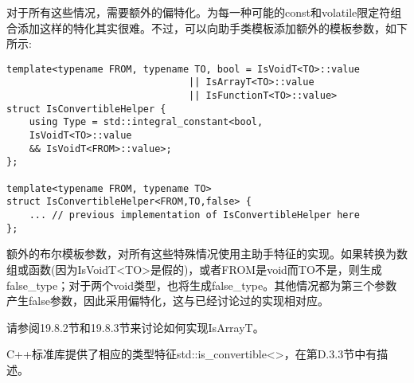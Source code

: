 对于所有这些情况，需要额外的偏特化。为每一种可能的const和volatile限定符组合添加这样的特化其实很难。不过，可以向助手类模板添加额外的模板参数，如下所示:

\begin{lstlisting}[style=styleCXX]
template<typename FROM, typename TO, bool = IsVoidT<TO>::value
								|| IsArrayT<TO>::value
								|| IsFunctionT<TO>::value>
struct IsConvertibleHelper {
	using Type = std::integral_constant<bool,
	IsVoidT<TO>::value
	&& IsVoidT<FROM>::value>;
};

template<typename FROM, typename TO>
struct IsConvertibleHelper<FROM,TO,false> {
	... // previous implementation of IsConvertibleHelper here
};
\end{lstlisting}

额外的布尔模板参数，对所有这些特殊情况使用主助手特征的实现。如果转换为数组或函数(因为IsVoidT<TO>是假的)，或者FROM是void而TO不是，则生成false\_type；对于两个void类型，也将生成false\_type。其他情况都为第三个参数产生false参数，因此采用偏特化，这与已经讨论过的实现相对应。

请参阅19.8.2节和19.8.3节来讨论如何实现IsArrayT。

C++标准库提供了相应的类型特征std::is\_convertible<>，在第D.3.3节中有描述。



